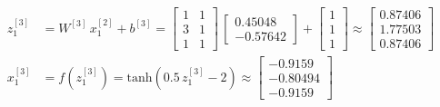 \documentclass[12pt]{article}
\begin{document}
\begin{enumerate}[leftmargin=\labelsep]
\begin{align*}
                z^{[3]}_1 &= {W}^{[3]} \, {x}^{[2]}_1 + {b}^{[3]} = \begin{bmatrix} 1 & 1 \\ 3 & 1 \\ 1 & 1\end{bmatrix} \,  \begin{bmatrix} 0.45048 \\ -0.57642\end{bmatrix} +
                \begin{bmatrix} 1 \\ 1 \\ 1\end{bmatrix} \approx \begin{bmatrix} 0.87406 \\ 1.77503 \\ 0.87406\end{bmatrix} \\
                {x}^{[3]}_1 &= f\left({z}^{[3]}_1\right) = \text{tanh}\left(0.5\,{z}^{[3]}_1 - 2\right) \approx \begin{bmatrix} -0.9159 \\ -0.80494 \\ -0.9159\end{bmatrix}
            \end{align*}
            \endgroup


\end{enumerate}
\end{document}
